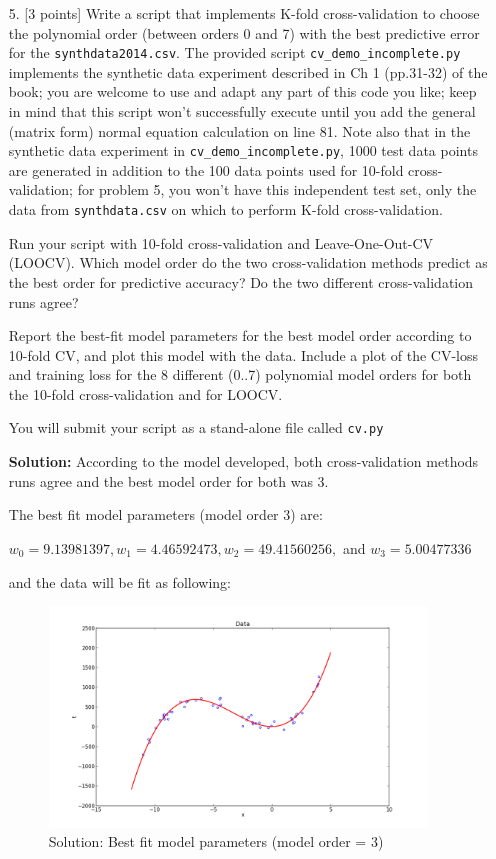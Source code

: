 \documentclass[10pt]{article}
\begin{document}
\begin{itemize}
\item[5.] [3 points]
Write a script that implements K-fold cross-validation to choose the polynomial order (between orders 0 and 7) with the best predictive error for the {\tt synthdata2014.csv}.  The provided script {\tt cv\_demo\_incomplete.py} implements the synthetic data experiment described in Ch 1 (pp.31-32) of the book; you are welcome to use and adapt any part of this code you like; keep in mind that this script won't successfully execute until you add the general (matrix form) normal equation calculation on line 81.
Note also that in the synthetic data experiment in {\tt cv\_demo\_incomplete.py}, 1000 test data points are generated in addition to the 100 data points used for 10-fold cross-validation; for problem 5, you won't have this independent test set, only the data from {\tt synthdata.csv} on which to perform K-fold cross-validation.

Run your script with 10-fold cross-validation and Leave-One-Out-CV (LOOCV).
Which model order do the two cross-validation methods predict as the best order for predictive accuracy?
Do the two different cross-validation runs agree?

Report the best-fit model parameters for the best model order according to 10-fold CV, and plot this model with the data.
Include a plot of the CV-loss and training loss for the 8 different (0..7) polynomial model orders for both the 10-fold cross-validation and for LOOCV.

You will submit your script as a stand-alone file called {\tt cv.py}

{\bf Solution:}  According to the model developed, both cross-validation methods runs agree and the best model order for both was 3. 

The best fit model parameters (model order 3) are:

$w_{0} = 9.13981397, w_{1} =  4.46592473, w_{2} =  49.41560256 ,$ and $w_{3} =  5.00477336 $

and the data will be fit as following:

          
\begin{figure}[htb]
\begin{center}
\includegraphics[width=10cm]{figs/figure_5.png}
\caption{Solution: Best fit model parameters (model order = 3)}
\end{center}
\end{figure}



\end{itemize}
\end{document}
